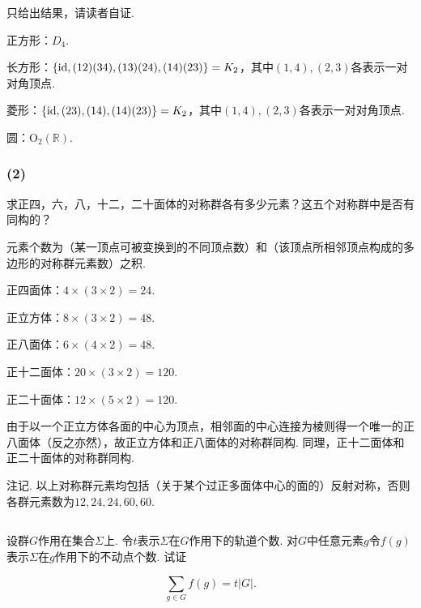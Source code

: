 \jie 只给出结果，请读者自证.

正方形：$D_4$.

长方形：$\{\operatorname{id}, (12)(34),(13)(24),(14)(23)\}=K_2$，其中$(1,4),(2,3)$各表示一对对角顶点.

菱形：$\{\operatorname{id}, (23), (14), (14)(23)\}=K_2$，其中$(1,4),(2,3)$各表示一对对角顶点.

圆：$\mathrm{O}_2(\mathbb{R})$.

\subsubsection{(2)}
求正四，六，八，十二，二十面体的对称群各有多少元素？这五个对称群中是否有同构的？

\jie 元素个数为（某一顶点可被变换到的不同顶点数）和（该顶点所相邻顶点构成的多边形的对称群元素数）之积.

正四面体：$4\times(3\times2)=24$.

正立方体：$8\times(3\times2)=48$.

正八面体：$6\times(4\times2)=48$.

正十二面体：$20\times(3\times2)=120$.

正二十面体：$12\times(5\times2)=120$.

由于以一个正立方体各面的中心为顶点，相邻面的中心连接为棱则得一个唯一的正八面体（反之亦然），故正立方体和正八面体的对称群同构. 同理，正十二面体和正二十面体的对称群同构.

{\heiti 注记.\enspace} 以上对称群元素均包括（关于某个过正多面体中心的面的）反射对称，否则各群元素数为$12,24,24,60,60$.

\subsection{}
设群$G$作用在集合$\Sigma$上. 令$t$表示$\Sigma$在$G$作用下的轨道个数. 对$G$中任意元素$g$令$f(g)$表示$\Sigma$在$g$作用下的不动点个数. 试证

$$\sum_{g\in G}f(g)=t|G|.$$


